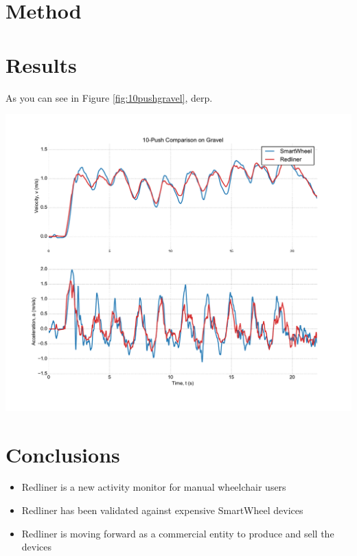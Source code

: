 \documentclass[a0,landscape]{a0poster}
\newenvironment{Figure}
  {\par\medskip\noindent\minipage{\linewidth}}
  {\endminipage\par\medskip}
\begin{document}
\begin{multicols*}{3}
\section*{Method}

\section*{Results}
As you can see in Figure \ref{fig:10pushgravel}, derp.

\begin{Figure}
    \centering
    \includegraphics[width=\linewidth]{data/assets/test.pdf}
    \label{fig:10pushgravel}
\end{Figure}

\section*{Conclusions}
\begin{itemize}
    \item Redliner is a new activity monitor for manual wheelchair users
    \item Redliner has been validated against expensive SmartWheel devices
    \item Redliner is moving forward as a commercial entity to produce and sell the devices
\end{itemize}


\end{multicols*}
\end{document}
